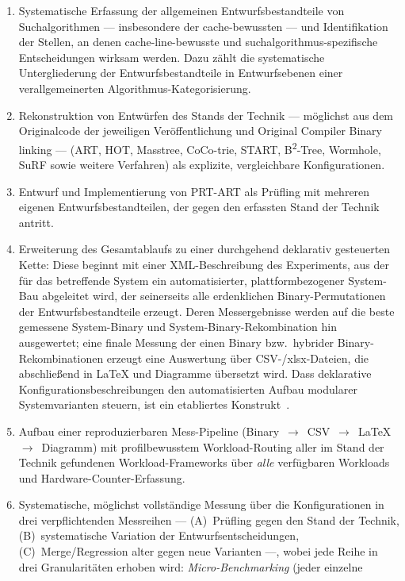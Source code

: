 \begin{enumerate}
  \item Systematische Erfassung der allgemeinen Entwurfsbestandteile von Suchalgorithmen ---
  insbesondere der cache-bewussten --- und Identifikation der Stellen, an denen cache-line-bewusste
  und suchalgorithmus-spezifische Entscheidungen wirksam werden. Dazu zählt die systematische
  Untergliederung der Entwurfsbestandteile in Entwurfsebenen einer verallgemeinerten
  Algorithmus-Kategorisierung.
  \item Rekonstruktion von Entwürfen des Stands der Technik --- möglichst aus dem Originalcode der
  jeweiligen Veröffentlichung und Original Compiler Binary linking --- (ART, HOT, Masstree,
  CoCo-trie, START, B\textsuperscript{2}-Tree, Wormhole, SuRF sowie weitere Verfahren) als
  explizite, vergleichbare Konfigurationen.
  \item Entwurf und Implementierung von PRT-ART als Prüfling mit mehreren eigenen
  Entwurfsbestandteilen, der gegen den erfassten Stand der Technik antritt.
  \item Erweiterung des Gesamtablaufs zu einer durchgehend deklarativ gesteuerten Kette: Diese
  beginnt mit einer XML-Beschreibung des Experiments, aus der für das betreffende System ein
  automatisierter, plattformbezogener System-Bau abgeleitet wird, der seinerseits alle erdenklichen
  Binary-Permutationen der Entwurfsbestandteile erzeugt. Deren Messergebnisse werden auf die beste
  gemessene System-Binary und System-Binary-Rekombination hin ausgewertet; eine finale Messung der
  einen Binary bzw.\ hybrider Binary-Rekombinationen erzeugt eine Auswertung über CSV-/xlsx-Dateien,
  die abschließend in LaTeX und Diagramme übersetzt wird. Dass deklarative
  Konfigurationsbeschreibungen den automatisierten Aufbau modularer Systemvarianten steuern, ist ein
  etabliertes Konstrukt~\cite{czarnecki2000generative, apel2013feature}.
  \item Aufbau einer reproduzierbaren Mess-Pipeline (Binary~$\to$~CSV~$\to$~LaTeX~$\to$~Diagramm)
  mit profilbewusstem Workload-Routing aller im Stand der Technik gefundenen Workload-Frameworks
  über \emph{alle} verfügbaren Workloads und Hardware-Counter-Erfassung.
  \item Systematische, möglichst vollständige Messung über die Konfigurationen in drei
  verpflichtenden Messreihen --- (A)~Prüfling gegen den Stand der Technik, (B)~systematische
  Variation der Entwurfsentscheidungen, (C)~Merge/Regression alter gegen neue Varianten ---, wobei
  jede Reihe in drei Granularitäten erhoben wird: \emph{Micro-Benchmarking} (jeder einzelne

\end{enumerate}
